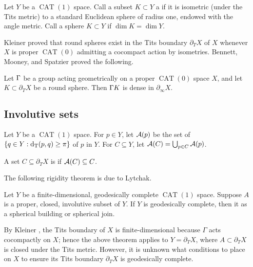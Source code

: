 \documentclass{amsart}
\renewcommand{\setp}[2]{\left\{#1 : #2\right\}}
\newcommand{\bdT}{\partial_T}
\newcommand{\bdc}{\partial_{\infty}}
\DeclareMathOperator{\CAT}{CAT}
\begin{document}
\begin{definition}
Let $Y$ be a $\CAT(1)$ space.
Call a subset $K \subset Y$ a  if it is isometric (under the Tits metric) to a standard Euclidean sphere of radius one, endowed with the angle metric.  Call a sphere $K \subset Y$  if $\dim K = \dim Y$. \end{definition}

Kleiner proved \cite[Theorem C]{kleiner} that round spheres exist in the Tits boundary $\bdT X$ of $X$ whenever $X$ is proper $\CAT(0)$ admitting a cocompact action by isometries.
Bennett, Mooney, and Spatzier \cite[Corollary 2.5]{bms} proved the following.

\begin{lemma}			\label{density of round spheres}
Let $\Gamma$ be a group acting geometrically on a proper $\CAT(0)$ space $X$, and let $K \subset \bdT X$ be a round sphere.  Then $\Gamma K$ is dense in $\bdc X$. \end{lemma}

\subsection{Involutive sets}

Let $Y$ be a $\CAT(1)$ space.  For $p \in Y$, let $\operatorname{\mathcal A}(p)$ be the set of  $\setp{q \in Y}{\dT(p, q) \ge \pi}$ of $p$ in $Y$.  For $C \subseteq Y$, let $\operatorname{\mathcal A}(C) = \bigcup_{p \in C} \operatorname{\mathcal A}(p)$.

\begin{definition}
A set $C \subseteq \bdT X$ is  if $\operatorname{\mathcal A}(C) \subseteq C$. \end{definition}

The following rigidity theorem is due to Lytchak.

\begin{theorem} 		\label{lytchak rigidity}
Let $Y$ be a finite-dimensional, geodesically complete $\CAT(1)$ space.
Suppose $A$ is a proper, closed, involutive subset of $Y$.
If $Y$ is geodesically complete, then it as a spherical building or spherical join. \end{theorem}

By Kleiner \cite{kleiner}, the Tits boundary of $X$ is finite-dimensional because $\Gamma$ acts cocompactly on $X$; hence the above theorem applies to $Y = \bdT X$, where $A \subset \bdT X$ is closed under the Tits metric.
However, it is unknown what conditions to place on $X$ to ensure its Tits boundary $\bdT X$ is geodesically complete.
\end{document}
